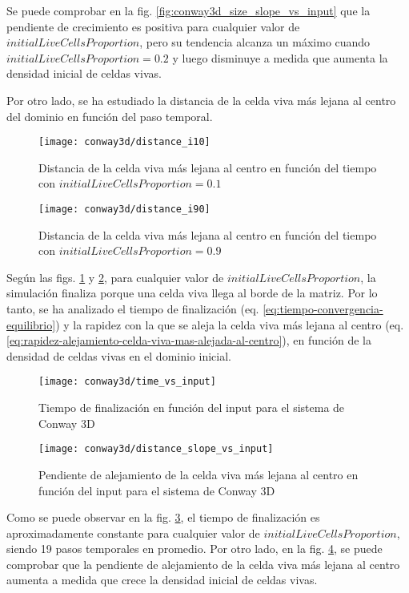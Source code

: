 Se puede comprobar en la fig. \ref{fig:conway3d_size_slope_vs_input} que la pendiente de crecimiento es positiva
para cualquier valor de $initialLiveCellsProportion$, pero su tendencia alcanza un máximo cuando
$initialLiveCellsProportion = 0.2$ y luego disminuye a medida que aumenta la densidad inicial de celdas vivas.

Por otro lado, se ha estudiado la distancia de la celda viva más lejana al centro del dominio en función del
paso temporal.

\begin{figure}[H]
    \centering
    \texttt{[image: conway3d/distance\_i10]}
    \caption{Distancia de la celda viva más lejana al centro en función del tiempo con $initialLiveCellsProportion = 0.1$}
    \label{fig:conway3d_d10}
\end{figure}
\begin{figure}[H]
    \centering
    \texttt{[image: conway3d/distance\_i90]}
    \caption{Distancia de la celda viva más lejana al centro en función del tiempo con $initialLiveCellsProportion = 0.9$}
    \label{fig:conway3d_d90}
\end{figure}

Según las figs. \ref{fig:conway3d_d10} y \ref{fig:conway3d_d90}, para cualquier valor de $initialLiveCellsProportion$,
la simulación finaliza porque una celda viva llega al borde de la matriz.
Por lo tanto, se ha analizado el tiempo de finalización (eq. \ref{eq:tiempo-convergencia-equilibrio}) y la
rapidez con la que se aleja la celda viva más lejana al centro
(eq. \ref{eq:rapidez-alejamiento-celda-viva-mas-alejada-al-centro}), en función de la densidad de celdas vivas
en el dominio inicial.

\begin{figure}[H]
    \centering
    \texttt{[image: conway3d/time\_vs\_input]}
    \caption{Tiempo de finalización en función del input para el sistema de Conway 3D}
    \label{fig:conway3d_time_vs_input}
\end{figure}
\begin{figure}[H]
    \centering
    \texttt{[image: conway3d/distance\_slope\_vs\_input]}
    \caption{Pendiente de alejamiento de la celda viva más lejana al centro en función del input para el sistema de Conway 3D}
    \label{fig:conway3d_distance_slope_vs_input}
\end{figure}

Como se puede observar en la fig. \ref{fig:conway3d_time_vs_input}, el tiempo de finalización es
aproximadamente constante para cualquier valor de $initialLiveCellsProportion$, siendo 19 pasos temporales en promedio.
Por otro lado, en la fig. \ref{fig:conway3d_distance_slope_vs_input}, se puede comprobar que la pendiente de alejamiento
de la celda viva más lejana al centro aumenta a medida que crece la densidad inicial de celdas vivas.


